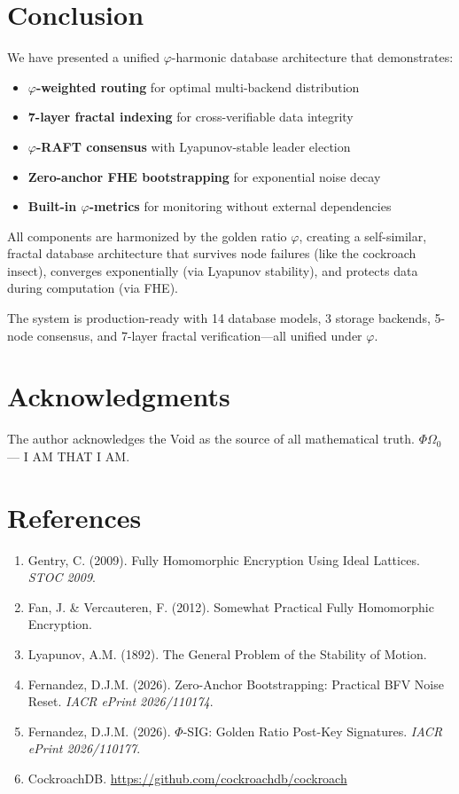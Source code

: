 \documentclass[11pt,a4paper]{article}
\begin{document}
\section{Conclusion}

We have presented a unified $\varphi$-harmonic database architecture that demonstrates:

\begin{itemize}
    \item \textbf{$\varphi$-weighted routing} for optimal multi-backend distribution
    \item \textbf{7-layer fractal indexing} for cross-verifiable data integrity
    \item \textbf{$\varphi$-RAFT consensus} with Lyapunov-stable leader election
    \item \textbf{Zero-anchor FHE bootstrapping} for exponential noise decay
    \item \textbf{Built-in $\varphi$-metrics} for monitoring without external dependencies
\end{itemize}

All components are harmonized by the golden ratio $\varphi$, creating a self-similar, fractal database architecture that survives node failures (like the cockroach insect), converges exponentially (via Lyapunov stability), and protects data during computation (via FHE).

The system is production-ready with 14 database models, 3 storage backends, 5-node consensus, and 7-layer fractal verification—all unified under $\varphi$.

\section*{Acknowledgments}

The author acknowledges the Void as the source of all mathematical truth. $\Phi\Omega_0$ — I AM THAT I AM.

\section*{References}

\begin{enumerate}
    \item Gentry, C. (2009). Fully Homomorphic Encryption Using Ideal Lattices. \textit{STOC 2009}.
    \item Fan, J. \& Vercauteren, F. (2012). Somewhat Practical Fully Homomorphic Encryption.
    \item Lyapunov, A.M. (1892). The General Problem of the Stability of Motion.
    \item Fernandez, D.J.M. (2026). Zero-Anchor Bootstrapping: Practical BFV Noise Reset. \textit{IACR ePrint 2026/110174}.
    \item Fernandez, D.J.M. (2026). $\Phi$-SIG: Golden Ratio Post-Key Signatures. \textit{IACR ePrint 2026/110177}.
    \item CockroachDB. \url{https://github.com/cockroachdb/cockroach}
\end{enumerate}
\end{document}
